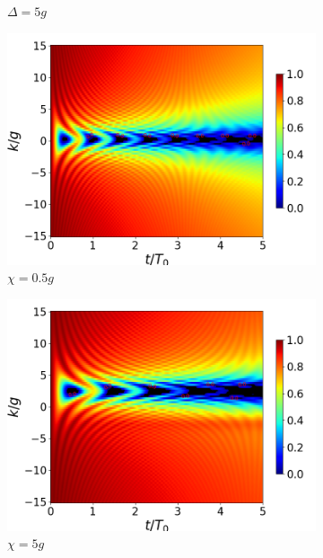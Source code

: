 \begin{figure}[h]
\begin{subfigure}{0.49\textwidth}
        \caption{$\Delta=5g$}
        \label{fig4:concu k d2}
    \end{subfigure}
    \vfill
    \begin{subfigure}{0.49\textwidth}
        \includegraphics[width=\textwidth]{figuras/ch4/concu/k/eg0+ge0 d=0.0g x=0.5g J=15.0g gamma=0.25g concu k dis.png}
        \caption{$\chi=0.5g$}
        \label{fig4:concu k x1}
    \end{subfigure}
    \hfill
    \begin{subfigure}{0.49\textwidth}
        \includegraphics[width=\textwidth]{figuras/ch4/concu/k/eg0+ge0 d=0.0g x=5.0g J=15.0g gamma=0.25g concu k dis.png}
        \caption{$\chi=5g$}
        \label{fig4:concu k x2}
    \end{subfigure}
    \caption{}
    \label{fig4:concu k params}
\end{figure}
